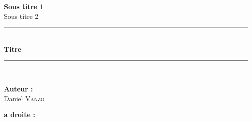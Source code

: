 
\let\cleardoublepage\clearpage

\begin{titlepage}
\begin{center}

\vspace{2\baselineskip}
\textbf{ Sous titre 1}\\[0.5cm]

{\large Sous titre 2}\\[0.5cm]

\rule{\linewidth}{0.5mm} \\[0.4cm]
{ \huge \bfseries Titre \\[0.4cm] }
\rule{\linewidth}{0.5mm} \\[1.5cm]

\noindent
\begin{minipage}{0.4\textwidth}
  \begin{flushleft} \large
    \textbf{Auteur :}\\
    Daniel \textsc{Vanzo}\\    
  \end{flushleft}
\end{minipage}%

\begin{minipage}{0.4\textwidth}
  \begin{flushright} \large
    \textbf{a droite :} \\
  \end{flushright}
\end{minipage}

\vspace{3\baselineskip}


\vfill



\end{center}
\end{titlepage}
